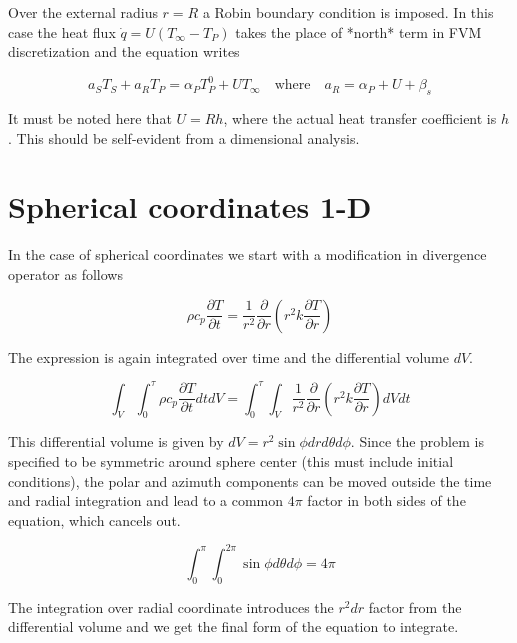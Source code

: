 \documentclass[oneside]{textbook}
\begin{document}
Over the external radius $r=R$ a Robin boundary condition is imposed. In this case the heat flux $\dot{q}=U(T_\infty-T_P)$ takes the place of *north* term in FVM discretization and the equation writes

\begin{equation}
a_ST_S + a_RT_P = \alpha_{P}T_P^{0}+UT_\infty\quad\text{where}\quad{}a_R=\alpha_{P}+U+\beta_{s}
\end{equation}

It must be noted here that $U=Rh$, where the actual heat transfer coefficient is $h$. This should be self-evident from a dimensional analysis.

\section{Spherical coordinates 1-D}

In the case of spherical coordinates we start with a modification in divergence operator as follows

\begin{equation}
\rho{}c_{p}\frac{\partial{}T}{\partial{}t}=
\frac{1}{r^2}\frac{\partial}{\partial{}r}
\left(r^2k\frac{\partial{}T}{\partial{}r}\right)
\end{equation}

The expression is again integrated over time and the differential volume $dV$.

\begin{equation}
\int_{V}\int_{0}^{\tau}
\rho{}c_{p}\frac{\partial{}T}{\partial{}t}dtdV=
\int_{0}^{\tau}\int_{V}
\frac{1}{r^2}\frac{\partial}{\partial{}r}
\left(r^2k\frac{\partial{}T}{\partial{}r}\right)dVdt
\end{equation}

This differential volume is given by $dV=r^2\sin\phi{}dr{}d\theta{}d\phi$. Since the problem is specified to be symmetric around sphere center (this must include initial conditions), the polar and azimuth components can be moved outside the time and radial integration and lead to a common $4\pi$ factor in both sides of the equation, which cancels out.

\begin{equation}
\int_{0}^{\pi}\int_{0}^{2\pi}\sin\phi{}d\theta{}d\phi=4\pi
\end{equation}

The integration over radial coordinate introduces the $r^2dr$ factor from the differential volume and we get the final form of the equation to integrate.
\end{document}
